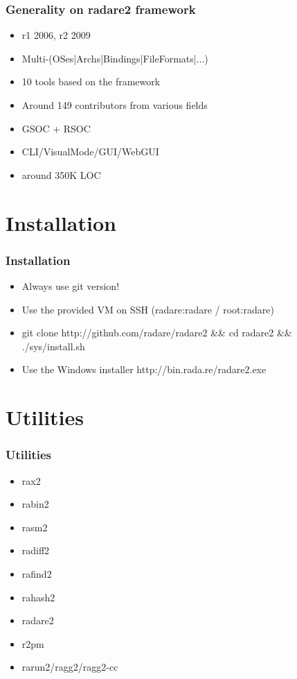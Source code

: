 \documentclass[10pt,pdf,utf8,english,compress,hyperref={unicode}]{beamer}
\begin{document}
\begin{frame}[fragile]
  \frametitle{Generality on radare2 framework}
  \begin{itemize}
  \item r1 2006, r2 2009
  \item Multi-(OSes|Archs|Bindings|FileFormats|...)
  \item 10 tools based on the framework
  \item Around 149 contributors from various fields
  \item GSOC + RSOC
  \item CLI/VisualMode/GUI/WebGUI
  \item around 350K LOC
  \end{itemize}
\end{frame}

\section{Installation}

\begin{frame}[fragile]
  \frametitle{Installation}
  \begin{itemize}
  \item Always use git version!
  \item Use the provided VM on SSH (\alert{radare:radare} / \alert{root:radare})
  \item git clone \alert{http://github.com/radare/radare2 \&\& cd radare2 \&\& ./sys/install.sh}
  \item Use the Windows installer \alert{http://bin.rada.re/radare2.exe}
  \end{itemize}
\end{frame}

\section{Utilities}

\begin{frame}[fragile]
  \frametitle{Utilities}
     \begin{itemize}
        \item rax2
        \item rabin2
        \item rasm2
        \item radiff2
        \item rafind2
        \item rahash2
        \item radare2
        \item r2pm
        \item rarun2/ragg2/ragg2-cc
      \end{itemize}
\end{frame}
\end{document}
